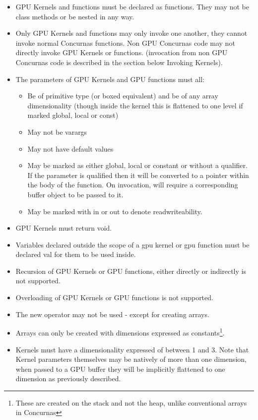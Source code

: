 \documentclass[conc-doc]{subfiles}
\begin{document}
\begin{itemize}
	\item GPU Kernels and functions must be declared as functions. They may not be class methods or be nested in any way.
	\item Only GPU Kernels and functions may only invoke one another, they cannot invoke normal Concurnas functions. Non GPU Concurnas code may not directly invoke GPU Kernels or functions. (invocation from non GPU Concurnas code is described in the section below Invoking Kernels).
	\item The parameters of GPU Kernels and GPU functions must all:
	\begin{itemize}
		\item Be of primitive type (or boxed equivalent) and be of any array dimensionality (though inside the kernel this is flattened to one level if marked global, local or const)
		\item May not be varargs
		\item May not have default values
		\item May be marked as either global, local or constant or without a qualifier. If the parameter is qualified then it will be converted to a pointer within the body of the function. On invocation, will require a corresponding buffer object to be passed to it.
		\item May be marked with in or out to denote readwriteability.
	\end{itemize}
	\item GPU Kernels must return void.
	\item Variables declared outside the scope of a gpu kernel or gpu function must be declared val for them to be used inside.
	\item Recursion of GPU Kernels or GPU functions, either directly or indirectly is not supported.
	\item Overloading of GPU Kernels or GPU functions is not supported.
	\item The new operator may not be used - except for creating arrays.
	\item Arrays can only be created with dimensions expressed as constants\footnote{These are created on the stack and not the heap, unlike conventional arrays in Concurnas}.
	\item Kernels must have a dimensionality expressed of between 1 and 3.
	Note that Kernel parameters themselves may be natively of more than one dimension, when passed to a GPU buffer they will be implicitly flattened to one dimension as previously described.
\end{itemize}
\end{document}
